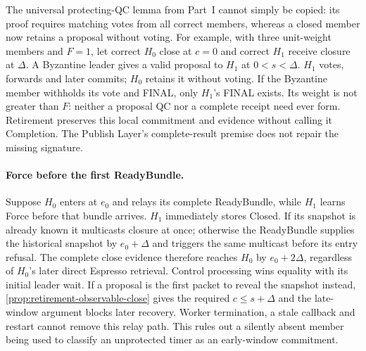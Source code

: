 The universal protecting-QC lemma from Part~I cannot simply be copied:
its proof requires matching votes from all correct members, whereas a
closed member now retains a proposal without voting. For example, with
three unit-weight members and $F=1$, let correct $H_0$ close at $c=0$
and correct $H_1$ receive closure at $\Delta$. A Byzantine leader gives
a valid proposal to $H_1$ at $0<s<\Delta$. $H_1$ votes, forwards and
later commits; $H_0$ retains it without voting. If the Byzantine member
withholds its vote and FINAL, only $H_1$'s FINAL exists. Its weight is
not greater than $F$: neither a proposal QC nor a complete receipt need
ever form. Retirement preserves this local commitment and evidence
without calling it Completion. The Publish Layer's complete-result
premise does not repair the missing signature.

\paragraph{Force before the first ReadyBundle.}
Suppose $H_0$ enters at $e_0$ and relays its complete ReadyBundle, while
$H_1$ learns Force before that bundle arrives. $H_1$ immediately stores
Closed. If its snapshot is already known it multicasts closure at once;
otherwise the ReadyBundle supplies the historical snapshot by
$e_0+\Delta$ and triggers the same multicast before its entry refusal.
The complete close evidence therefore reaches $H_0$ by $e_0+2\Delta$,
regardless of $H_0$'s later direct Espresso retrieval. Control processing
wins equality with its initial leader wait. If a proposal is the first
packet to reveal the snapshot instead, \cref{prop:retirement-observable-close}
gives the required $c\le s+\Delta$ and the late-window argument blocks
later recovery. Worker termination, a stale callback and restart cannot
remove this relay path. This rules out a silently absent member being
used to classify an unprotected timer as an early-window commitment.
